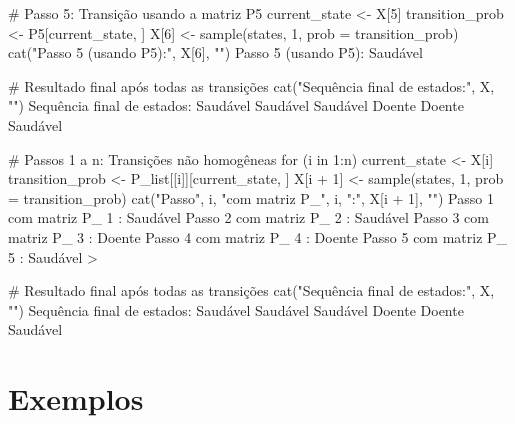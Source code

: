 \documentclass[12pt, a4paper, openany]{book}
\numberwithin{equation}{chapter}
\numberwithin{table}{chapter}
\numberwithin{figure}{chapter}
\theoremstyle{break}
\begin{document}
\begin{itemize}
\begin{RCodeBox}
# Passo 5: Transição usando a matriz P5
current_state <- X[5]
transition_prob <- P5[current_state, ]
X[6] <- sample(states, 1, prob = transition_prob)
cat("Passo 5 (usando P5):", X[6], "\n")
Passo 5 (usando P5): Saudável

# Resultado final após todas as transições
cat("Sequência final de estados:", X, "\n")
Sequência final de estados: Saudável Saudável Saudável Doente Doente Saudável 
\end{RCodeBox}






\begin{RCodeBox}
# Passos 1 a n: Transições não homogêneas
for (i in 1:n) {
  current_state <- X[i]
  transition_prob <- P_list[[i]][current_state, ]
  X[i + 1] <- sample(states, 1, prob = transition_prob)
  cat("Passo", i, "com matriz P_", i, ":", X[i + 1], "\n")
}
Passo 1 com matriz P_ 1 : Saudável 
Passo 2 com matriz P_ 2 : Saudável 
Passo 3 com matriz P_ 3 : Doente 
Passo 4 com matriz P_ 4 : Doente 
Passo 5 com matriz P_ 5 : Saudável 
> 

# Resultado final após todas as transições
cat("Sequência final de estados:", X, "\n")
Sequência final de estados: Saudável Saudável Saudável Doente Doente Saudável 
\end{RCodeBox}





\end{itemize}








\chapter{Exemplos}
\end{document}
